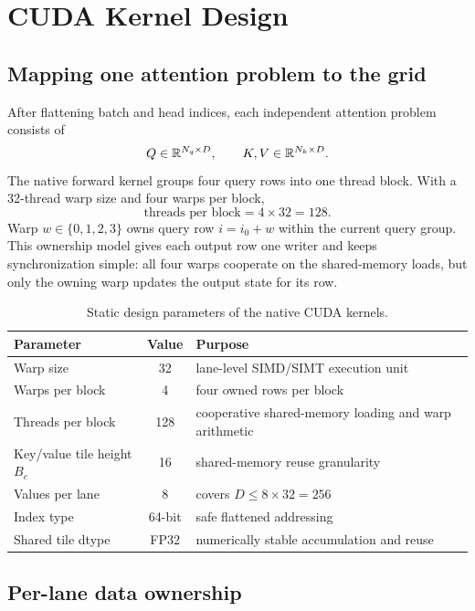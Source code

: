 \chapter{CUDA Kernel Design}
\label{chap:cuda-design}

\section{Mapping one attention problem to the grid}

After flattening batch and head indices, each independent attention problem consists of
\begin{equation}
  Q \in \mathbb{R}^{N_q \times D}, \qquad K,V \in \mathbb{R}^{N_k \times D}.
\end{equation}
The native forward kernel groups four query rows into one thread block. With a 32-thread warp size and four warps per block,
\begin{equation}
  \text{threads per block} = 4 \times 32 = 128.
\end{equation}
Warp $w\in\{0,1,2,3\}$ owns query row $i = i_0 + w$ within the current query group. This ownership model gives each output row one writer and keeps synchronization simple: all four warps cooperate on the shared-memory loads, but only the owning warp updates the output state for its row.

\begin{table}[htbp]
\centering
\caption{Static design parameters of the native CUDA kernels.}
\label{tab:cuda-static-parameters}
\begin{tabular}{@{}l c l@{}}
\toprule
Parameter & Value & Purpose \\
\midrule
Warp size & 32 & lane-level SIMD/SIMT execution unit \\
Warps per block & 4 & four owned rows per block \\
Threads per block & 128 & cooperative shared-memory loading and warp arithmetic \\
Key/value tile height $B_c$ & 16 & shared-memory reuse granularity \\
Values per lane & 8 & covers $D \le 8\times 32 = 256$ \\
Index type & 64-bit & safe flattened addressing \\
Shared tile dtype & FP32 & numerically stable accumulation and reuse \\
\bottomrule
\end{tabular}
\end{table}

\section{Per-lane data ownership}

